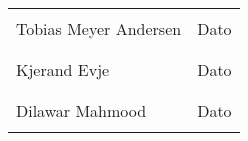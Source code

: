 \noindent\begin{tabular}{@{}p{2.5in}p{2.5in}@{}}
\dotfill                         & \dotfill\\
Tobias Meyer Andersen              & Dato\\
                                 & \\[8ex]
\dotfill                         & \dotfill\\
Kjerand Evje              & Dato\\
                                 & \\[8ex]
\dotfill                         & \dotfill\\
Dilawar Mahmood              & Dato\\
                                 & \\[8ex]
\end{tabular}
\newpage